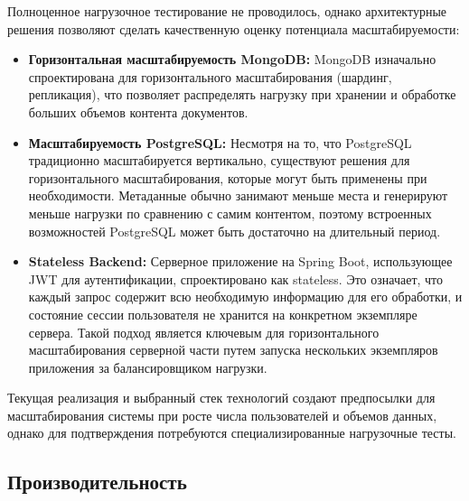 Полноценное нагрузочное тестирование не проводилось, однако архитектурные решения позволяют сделать качественную оценку потенциала масштабируемости:
\begin{itemize}
    \item \textbf{Горизонтальная масштабируемость MongoDB:} MongoDB изначально спроектирована для горизонтального масштабирования (шардинг, репликация), что позволяет распределять нагрузку при хранении и обработке больших объемов контента документов.
    \item \textbf{Масштабируемость PostgreSQL:} Несмотря на то, что PostgreSQL традиционно масштабируется вертикально, существуют решения для горизонтального масштабирования, которые могут быть применены при необходимости. Метаданные обычно занимают меньше места и генерируют меньше нагрузки по сравнению с самим контентом, поэтому встроенных возможностей PostgreSQL может быть достаточно на длительный период.
    \item \textbf{Stateless Backend:} Серверное приложение на Spring Boot, использующее JWT для аутентификации, спроектировано как stateless. Это означает, что каждый запрос содержит всю необходимую информацию для его обработки, и состояние сессии пользователя не хранится на конкретном экземпляре сервера. Такой подход является ключевым для горизонтального масштабирования серверной части путем запуска нескольких экземпляров приложения за балансировщиком нагрузки.
\end{itemize}
Текущая реализация и выбранный стек технологий создают предпосылки для масштабирования системы при росте числа пользователей и объемов данных, однако для подтверждения потребуются специализированные нагрузочные тесты.

\clearpage
\subsection{Производительность}

